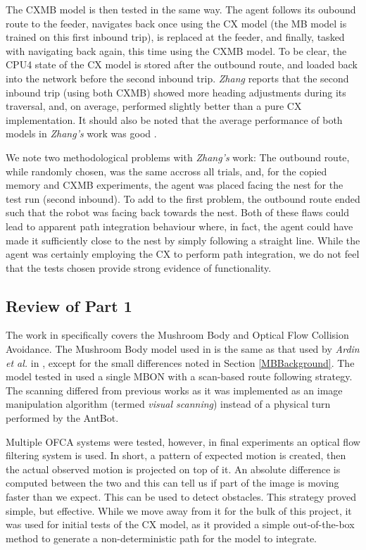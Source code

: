 \documentclass[a4paper,11pt,twoside,openright]{article}
\begin{document}
The CXMB model is then tested in the same way. The agent follows its oubound
route to the feeder, navigates back once using the CX model (the MB model is
trained on this first inbound trip), is replaced at the
feeder, and finally, tasked with navigating back again, this time using the CXMB
model. To be clear, the CPU4 state of the CX model is stored after the outbound
route, and loaded back into the network before the second inbound trip.
\textit{Zhang} reports that the second inbound trip (using both CXMB) showed
more heading adjustments during its traversal, and, on average, performed
slightly better than a pure CX implementation\cite{Zhang2017}. It should also
be noted that the average performance of both models in \textit{Zhang's} work
was good \cite{Zhang2017}.
\newline
\par

We note two methodological problems with \textit{Zhang's} work: The outbound
route, while randomly chosen, was the same accross all trials, and, for the
copied memory and CXMB experiments, the agent was placed facing the nest for
the test run (second inbound). To add to the first problem, the outbound route
ended such that the robot was facing back towards the nest. Both of these flaws
could lead to apparent path integration behaviour where, in fact, the agent
could have made it sufficiently close to the nest by simply following a straight
line. While the agent was certainly employing the CX to perform path integration,
we do not feel that the tests chosen provide strong evidence of functionality.

\subsection{ Review of Part 1 }
The work in \cite{Mitchell2018} specifically covers the Mushroom Body
and Optical Flow Collision Avoidance. The Mushroom Body model used in
\cite{Mitchell2018} is the same as that used by \textit{Ardin et al.} in
\cite{Ardin2016}, except for the small differences noted in Section
\ref{MBBackground}. The model tested in \cite{Mitchell2018} used a single MBON
with a scan-based route following strategy. The scanning differed from previous
works as it was implemented as an image manipulation algorithm (termed
\textit{visual scanning}) instead of a physical turn performed by the AntBot.
\newline
\par

Multiple OFCA systems were tested, however, in final experiments an
optical flow filtering system is used. In short, a pattern of expected motion is
created, then the actual observed motion is projected on top of it. An absolute
difference is computed between the two and this can tell us if part of the image
is moving faster than we expect. This can be used to detect obstacles. This
strategy proved simple, but effective. While we move away from it for the
bulk of this project, it was used for initial tests of the CX model, as it
provided a simple out-of-the-box method to generate a non-deterministic
path for the model to integrate.
\newline
\par
\end{document}
